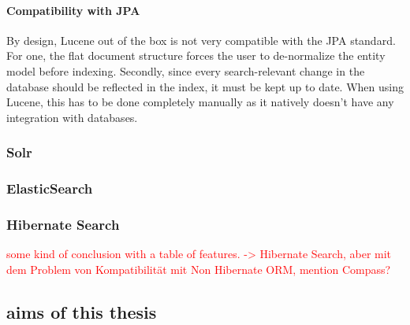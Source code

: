 \paragraph{Compatibility with JPA}
By design, Lucene out of the box is not very compatible with the JPA standard. For one, the flat document structure forces the user to de-normalize the entity model before indexing. Secondly, since every search-relevant change in the database should be reflected in the index, it must be kept up to date. When using Lucene, this has to be done completely manually as it natively doesn't have any integration with databases.

\subsubsection{Solr}

\subsubsection{ElasticSearch}

\subsubsection{Hibernate Search}

\textcolor{red}{some kind of conclusion with a table of features. -> Hibernate Search, aber mit dem Problem von Kompatibilität mit Non Hibernate ORM, mention Compass?}

\subsection{aims of this thesis}
